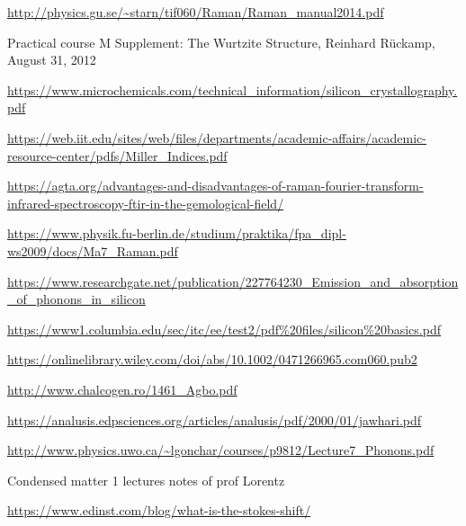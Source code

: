 \documentclass[openany,11pt,a4paper]{report}
\begin{document}
\begin{thebibliography}{99}


 \url{http://physics.gu.se/~starn/tif060/Raman/Raman_manual2014.pdf}



 Practical course M
Supplement: The Wurtzite Structure, Reinhard Rückamp, August 31, 2012


 \url{https://www.microchemicals.com/technical_information/silicon_crystallography.pdf}



 \url{https://web.iit.edu/sites/web/files/departments/academic-affairs/academic-resource-center/pdfs/Miller_Indices.pdf}


 \url{https://agta.org/advantages-and-disadvantages-of-raman-fourier-transform-infrared-spectroscopy-ftir-in-the-gemological-field/}



 \url{https://www.physik.fu-berlin.de/studium/praktika/fpa_dipl-ws2009/docs/Ma7_Raman.pdf}

 \url{https://www.researchgate.net/publication/227764230_Emission_and_absorption_of_phonons_in_silicon}

 \url{https://www1.columbia.edu/sec/itc/ee/test2/pdf%20files/silicon%20basics.pdf}


\bibitem{} \url{https://onlinelibrary.wiley.com/doi/abs/10.1002/0471266965.com060.pub2}


 \url{http://www.chalcogen.ro/1461_Agbo.pdf}


 \url{https://analusis.edpsciences.org/articles/analusis/pdf/2000/01/jawhari.pdf}


 \url{http://www.physics.uwo.ca/~lgonchar/courses/p9812/Lecture7_Phonons.pdf}


 Condensed matter 1 lectures notes of prof Lorentz


 \url{https://www.edinst.com/blog/what-is-the-stokes-shift/}

\end{thebibliography}
\end{document}
